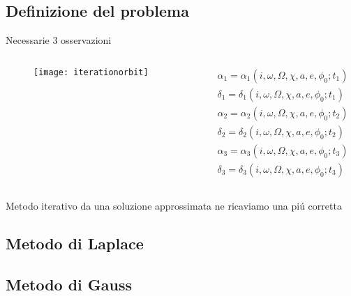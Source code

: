 \subsection{Definizione del problema}

\begin{frame}{Necessarie 3 osservazioni}

\begin{columns}

\begin{column}{0.3\textwidth}

\begin{figure}[!ht]

\texttt{[image: iterationorbit]}

\end{figure}

\end{column}

\begin{column}{0.7\textwidth}

\begin{align*}
&\alpha_1=\alpha_1(i,\omega,\Omega,\chi,a,e,\phi_0;t_1)\\
&\delta_1=\delta_1(i,\omega,\Omega,\chi,a,e,\phi_0;t_1)\\
&\alpha_2=\alpha_2(i,\omega,\Omega,\chi,a,e,\phi_0;t_2)\\
&\delta_2=\delta_2(i,\omega,\Omega,\chi,a,e,\phi_0;t_2)\\
&\alpha_3=\alpha_3(i,\omega,\Omega,\chi,a,e,\phi_0;t_3)\\
&\delta_3=\delta_3(i,\omega,\Omega,\chi,a,e,\phi_0;t_3)
\end{align*}

\end{column}

\end{columns}

\begin{block}{Metodo iterativo}
da una soluzione approssimata ne ricaviamo una pi\'u corretta
\end{block}

\end{frame}

\subsection{Metodo di Laplace}




\subsection{Metodo di Gauss}

